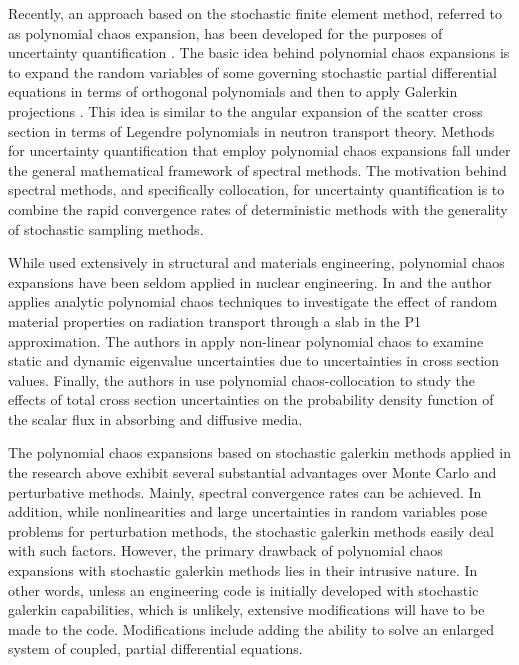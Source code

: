 Recently, an approach based on the stochastic finite element method, referred to as polynomial chaos expansion, has been developed for the purposes of uncertainty quantification \cite{Ghanem_Spanos}. The basic idea behind polynomial chaos expansions is to expand the random variables of some governing stochastic partial differential equations in terms of orthogonal polynomials and then to apply Galerkin projections \cite{LeMaitreKnio}. This idea is similar to the angular expansion of the scatter cross section in terms of Legendre polynomials in neutron transport theory. Methods for uncertainty quantification that employ polynomial chaos expansions fall under the general mathematical framework of spectral methods. The motivation behind spectral methods, and specifically collocation, for uncertainty quantification is to combine the rapid convergence rates of deterministic methods with the generality of stochastic sampling methods. 

While used extensively in structural and materials engineering, polynomial chaos expansions have been seldom applied in nuclear engineering. In \cite{MMR_Williams1} and \cite{MMR_Williams2} the author applies analytic polynomial chaos techniques to investigate the effect of random material properties on radiation transport through a slab in the P1 approximation. The authors in \cite{Ayres_Williams_Eaton} apply non-linear polynomial chaos to examine static and dynamic eigenvalue uncertainties due to uncertainties in cross section values. Finally, the authors in \cite{Fichtl_Prinja} use polynomial chaos-collocation to study the effects of total cross section uncertainties on the probability density function of the scalar flux in absorbing and diffusive media.    

The polynomial chaos expansions based on stochastic galerkin methods applied in the research above exhibit several substantial advantages over Monte Carlo and perturbative methods. Mainly, spectral convergence rates can be achieved. In addition, while nonlinearities and large uncertainties in random variables pose problems for perturbation methods, the stochastic galerkin methods easily deal with such factors. However, the primary drawback of polynomial chaos expansions with stochastic galerkin methods lies in their intrusive nature. In other words, unless an engineering code is initially developed with stochastic galerkin capabilities, which is unlikely, extensive modifications will have to be made to the code. Modifications include adding the ability to solve an enlarged system of coupled, partial differential equations.      

